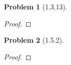 \documentclass[10pt]{article}
\newcommand{\sk}{\vskip 10mm}
\theoremstyle{plain}
\newtheorem{problem}{Problem}
\theoremstyle{remark}
\begin{document}
\sk

\begin{problem}[1.3.13] 
  
\end{problem}

\begin{proof}
  
\end{proof}

\sk

\begin{problem}[1.5.2] 
  
\end{problem}

\begin{proof}
  
\end{proof}

\sk

\end{document}
